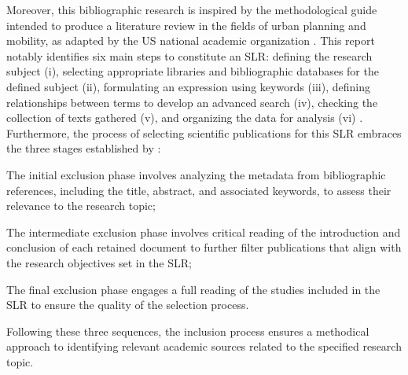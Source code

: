 \begin{refsegment}
Moreover, this bibliographic research is inspired by the methodological guide intended to produce a literature review in the fields of urban planning and mobility, as adapted by the US national academic organization \textcolor{blue}{\textcite{transportation_research_board_of_the_national_academies_literature_2015}}. This report notably identifies six main steps to constitute an \acrshort{SLR}: defining the research subject (i), selecting appropriate libraries and bibliographic databases for the defined subject (ii), formulating an expression using keywords (iii), defining relationships between terms to develop an advanced search (iv), checking the collection of texts gathered (v), and organizing the data for analysis (vi) \textcolor{blue}{\autocite[2-18]{transportation_research_board_of_the_national_academies_literature_2015}}. Furthermore, the process of selecting scientific publications for this \acrshort{SLR} embraces the three stages established by \textcolor{blue}{\textcite[2544]{jain_systematic_2020}}:
    \begin{customitemize}
        \item The initial exclusion phase involves analyzing the metadata from bibliographic references, including the title, abstract, and associated keywords, to assess their relevance to the research topic;
        \item The intermediate exclusion phase involves critical reading of the introduction and conclusion of each retained document to further filter publications that align with the research objectives set in the \acrshort{SLR};
        \item The final exclusion phase engages a full reading of the studies included in the \acrshort{SLR} to ensure the quality of the selection process.
    \end{customitemize}
Following these three sequences, the inclusion process ensures a methodical approach to identifying relevant academic sources related to the specified research topic.%


\end{refsegment}
